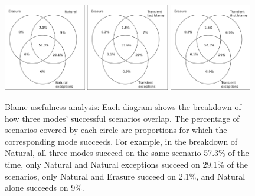 \begin{figure}
  \centering
  \includegraphics[width=0.32\textwidth]{./plots/TR-TR-stack-first-venn}
  \hfill
  \includegraphics[width=0.32\textwidth]{./plots/transient-newest-transient-stack-first-venn}
  \hfill
  \includegraphics[width=0.32\textwidth]{./plots/transient-oldest-transient-stack-first-venn}

  \caption{Blame usefulness analysis: Each diagram shows the breakdown of how three modes' successful scenarios overlap.
  The percentage of scenarios covered by each circle are proportions for which the corresponding mode succeeds.
  For example, in the breakdown of Natural, all three modes succeed on the same scenario 57.3\% of the time, only Natural and Natural exceptions succeed on 29.1\% of the scenarios, only Natural and Erasure succeed on 2.1\%, and Natural alone succeeds on 9\%.
  }
  \label{fig:success-venns}
\end{figure}


